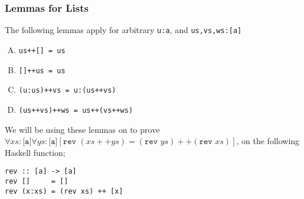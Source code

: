 \documentclass[a4paper, 12pt]{article}
\begin{document}
            \subsubsection*{Lemmas for Lists}
                The following lemmas apply for arbitrary \texttt{u:a}, and \texttt{us,vs,ws:[a]}
                \begin{enumerate}[(A)]
                    \item \texttt{us++[] = us}
                    \item \texttt{[]++us = us}
                    \item \texttt{(u:us)++vs = u:(us++vs)}
                    \item \texttt{(us++vs)++ws = us++(vs++ws)}
                \end{enumerate}
                We will be using these lemmas on to prove $\forall xs : \texttt{[a]} \forall ys : \texttt{[a]} [\texttt{rev } (xs ++ ys) = (\texttt{rev } ys) ++ (\texttt{rev } xs)]$, on the following Haskell function;
                \begin{verbatim}
rev :: [a] -> [a]
rev []     = []
rev (x:xs) = (rev xs) ++ [x]\end{verbatim}
                \medskip
\end{document}
